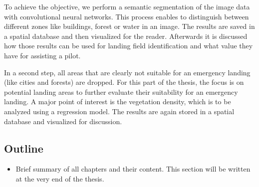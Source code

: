 To achieve the objective, we perform a semantic segmentation of the image data with convolutional neural networks. This process enables to distinguish between different zones like buildings, forest or water in an image. The results are saved in a spatial database and then visualized for the reader. Afterwards it is discussed how those results can be used for landing field identification and what value they have for assisting a pilot.

In a second step, all areas that are clearly not suitable for an emergency landing (like cities and forests) are dropped. For this part of the thesis, the focus is on potential landing areas to further evaluate their suitability for an emergency landing. A major point of interest is the vegetation density, which is to be analyzed using a regression model. The results are again stored in a spatial database and visualized for discussion.

\subsection{Outline}

\begin{itemize}
    \item Brief summary of all chapters and their content. This section will be written at the very end of the thesis.
\end{itemize}

\newpage